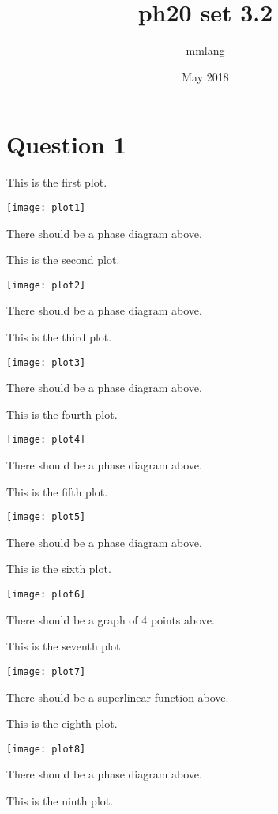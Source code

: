 \documentclass{article}
\title{ph20 set 3.2}
\author{mmlang }
\date{May 2018}
\begin{document}
\maketitle

\section{Question 1}
This is the first plot.

\texttt{[image: plot1]}

There should be a phase diagram above.

\bigskip

This is the second plot.

\texttt{[image: plot2]}

There should be a phase diagram above.

\bigskip

This is the third plot.

\texttt{[image: plot3]}

There should be a phase diagram above.

\bigskip

This is the fourth plot.

\texttt{[image: plot4]}

There should be a phase diagram above.

\bigskip

This is the fifth plot.

\texttt{[image: plot5]}

There should be a phase diagram above.

\bigskip

This is the sixth plot.

\texttt{[image: plot6]}

There should be a graph of 4 points above.

\bigskip

This is the seventh plot.

\texttt{[image: plot7]}

There should be a superlinear function above.

\bigskip

This is the eighth plot.

\texttt{[image: plot8]}

There should be a phase diagram above.

\bigskip

This is the ninth plot.
\end{document}
